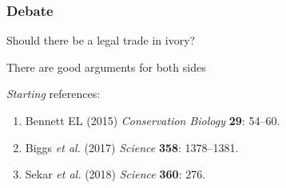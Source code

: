 \documentclass[10pt]{beamer}
\begin{document}
\begin{frame}[t]
\frametitle{Debate}
\vspace{0.5cm}

	\begin{center}
		\textcolor{myblue}{Should there be a legal trade in ivory?}\\
	\end{center}	
	
	\vspace{0.5cm}
	
	There are good arguments for both sides
	
	\vspace{0.5cm}
	\emph{Starting} references:
		\begin{enumerate}
			\item Bennett EL (2015) \emph{Conservation Biology} \textbf{29}: 54--60.
			\item Biggs \emph{et al.} (2017) \emph{Science} \textbf{358}: 1378--1381.
			\item Sekar \emph{et al.} (2018) \emph{Science} \textbf{360}: 276.
		\end{enumerate}
	
\end{frame}
\end{document}
